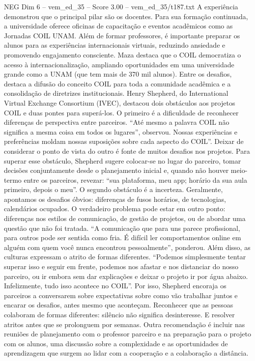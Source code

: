 \begin{textsample}{NEG Dim 6 – vem\_ed\_35 – Score 3.00 – vem\_ed\_35/t187.txt}
A experiência demonstrou que o principal pilar são os docentes.
Para sua formação continuada, a universidade oferece oficinas de capacitação e eventos acadêmicos como as Jornadas COIL UNAM.
Além de formar professores, é importante preparar os alunos para as experiências internacionais virtuais, reduzindo ansiedade e promovendo engajamento consciente.
Maza destaca que o COIL democratiza o acesso à internacionalização, ampliando oportunidades em uma universidade grande como a UNAM (que tem mais de 370 mil alunos).
Entre os desafios, destaca a difusão do conceito COIL para toda a comunidade acadêmica e a consolidação de diretrizes institucionais.
Henry Shepherd, do International Virtual Exchange Consortium (IVEC), destacou dois obstáculos aos projetos COIL e duas pontes para superá-los.
O primeiro é a dificuldade de reconhecer diferenças de perspectiva entre parceiros. “Até mesmo a palavra COIL não significa a mesma coisa em todos os lugares”, observou.
Nossas experiências e preferências moldam nossas suposições sobre cada aspecto do COIL”.
Deixar de considerar o ponto de vista do outro é fonte de muitos desafios nos projetos.
Para superar esse obstáculo, Shepherd sugere colocar-se no lugar do parceiro, tomar decisões conjuntamente desde o planejamento inicial e, quando não houver meio-termo entre os parceiros, revezar: “sua plataforma, meu app; horário da sua aula primeiro, depois o meu”.
O segundo obstáculo é a incerteza.
Geralmente, apontamos os desafios óbvios: diferenças de fusos horários, de tecnologias, calendários ocupados.
O verdadeiro problema pode estar em outro ponto: diferenças nos estilos de comunicação, de gestão de projetos, ou de abordar uma questão que não foi tratada. “A comunicação que para uns parece profissional, para outros pode ser sentida como fria.
É difícil ler comportamentos online em alguém com quem você nunca encontrou pessoalmente”, ponderou.
Além disso, as culturas expressam o atrito de formas diferentes. “Podemos simplesmente tentar superar isso e seguir em frente, podemos nos afastar e nos distanciar do nosso parceiro, ou ir embora sem dar explicações e deixar o projeto ir por água abaixo.
Infelizmente, tudo isso acontece no COIL”.
Por isso, Shepherd encoraja os parceiros a conversarem sobre expectativas sobre como vão trabalhar juntos e encarar os desafios, antes mesmo que aconteçam.
Reconhecer que as pessoas colaboram de formas diferentes: silêncio não significa desinteresse.
E resolver atritos antes que se prolonguem por semanas.
Outra recomendação é incluir nas reuniões de planejamento com o professor parceiro e na preparação para o projeto com os alunos, uma discussão sobre a complexidade e as oportunidades de aprendizagem que surgem ao lidar com a cooperação e a colaboração a distância.

\end{textsample}
